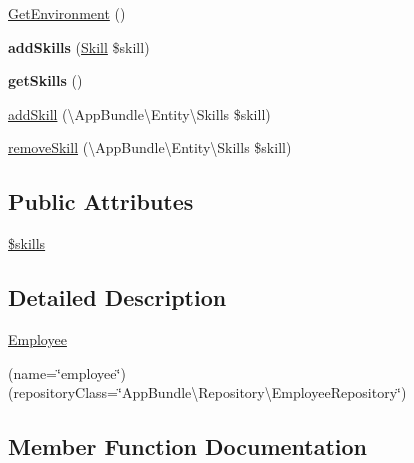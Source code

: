 \begin{DoxyCompactItemize}
\item 
\mbox{\hyperlink{class_app_bundle_1_1_entity_1_1_employee_a1eefb3ea4030d24b24ad529f4a20de21}{Get\+Environment}} ()
\item 
\mbox{\label{class_app_bundle_1_1_entity_1_1_employee_a8dbb03f672dce72b8a92d5ac77e27286}} 
{\bfseries add\+Skills} (\mbox{\hyperlink{class_app_bundle_1_1_entity_1_1_skill}{Skill}} \$skill)
\item 
\mbox{\label{class_app_bundle_1_1_entity_1_1_employee_a68fb017db13b94a968d43d1b636805d2}} 
{\bfseries get\+Skills} ()
\item 
\mbox{\hyperlink{class_app_bundle_1_1_entity_1_1_employee_afc80996e5115964f45fd60d9d55630fb}{add\+Skill}} (\textbackslash{}App\+Bundle\textbackslash{}\+Entity\textbackslash{}\+Skills \$skill)
\item 
\mbox{\hyperlink{class_app_bundle_1_1_entity_1_1_employee_a69717b66303d554ad4c4297c147ad01d}{remove\+Skill}} (\textbackslash{}App\+Bundle\textbackslash{}\+Entity\textbackslash{}\+Skills \$skill)
\end{DoxyCompactItemize}
\subsection*{Public Attributes}
\begin{DoxyCompactItemize}
\item 
\mbox{\hyperlink{class_app_bundle_1_1_entity_1_1_employee_ac121b7a30226c432e050d3d3c611cb7d}{\$skills}}
\end{DoxyCompactItemize}


\subsection{Detailed Description}
\mbox{\hyperlink{class_app_bundle_1_1_entity_1_1_employee}{Employee}}

(name=\char`\"{}employee\char`\"{}) (repository\+Class=\char`\"{}\+App\+Bundle\textbackslash{}\+Repository\textbackslash{}\+Employee\+Repository\char`\"{}) 

\subsection{Member Function Documentation}
\mbox{\label{class_app_bundle_1_1_entity_1_1_employee_afc80996e5115964f45fd60d9d55630fb}} 
